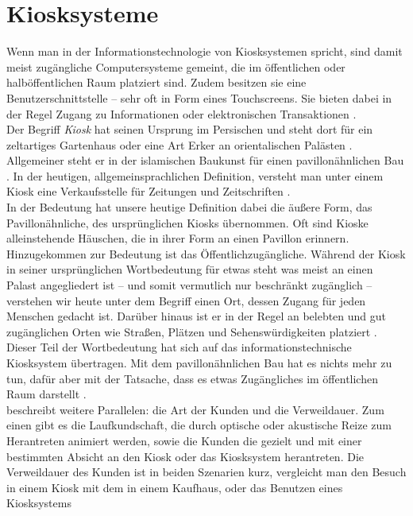 \section{Kiosksysteme}
\label{sec:kiosk}

Wenn man in der Informationstechnologie von Kiosksystemen spricht,
sind damit meist zugängliche Computersysteme gemeint, die im öffentlichen oder halböffentlichen 
Raum platziert sind. Zudem besitzen sie eine Benutzerschnittstelle -- sehr oft in Form
eines Touchscreens. Sie bieten dabei in der Regel Zugang zu Informationen 
oder elektronischen Transaktionen \cite{retailing}.\\

Der Begriff \emph{Kiosk} hat seinen Ursprung im Persischen und steht dort für
ein zeltartiges Gartenhaus oder eine Art Erker an orientalischen Palästen \cite{meyers}.
Allgemeiner steht er in der islamischen Baukunst für einen pavillonähnlichen Bau \cite{taschenlexikon}.
In der heutigen, allgemeinsprachlichen Definition, versteht man unter einem Kiosk eine Verkaufsstelle
für Zeitungen und Zeitschriften \cite{taschenlexikon, meyers}.\\
In der Bedeutung hat unsere heutige Definition dabei die äußere Form, das Pavillonähnliche, 
des ursprünglichen Kiosks übernommen. Oft sind Kioske alleinstehende Häuschen, die in ihrer Form
an einen Pavillon erinnern. Hinzugekommen zur Bedeutung ist das Öffentlichzugängliche. Während der Kiosk 
in seiner ursprünglichen Wortbedeutung für etwas steht was meist an einen Palast angegliedert ist -- und 
somit vermutlich nur beschränkt zugänglich -- verstehen wir heute unter dem Begriff einen Ort, dessen Zugang
für jeden Menschen gedacht ist. Darüber hinaus ist er in der Regel an belebten und gut zugänglichen Orten 
wie Straßen, Plätzen und Sehenswürdigkeiten platziert \cite{multimediale}.\\
Dieser Teil der Wortbedeutung hat sich auf das informationstechnische Kiosksystem übertragen. Mit dem 
pavillonähnlichen Bau hat es nichts mehr zu tun, dafür aber mit der Tatsache, dass es etwas Zugängliches 
im öffentlichen Raum darstellt \cite{multimediale}.\\
 beschreibt weitere Parallelen: die Art der Kunden und 
die Verweildauer. Zum einen gibt es die Laufkundschaft, die durch optische oder akustische Reize
zum Herantreten animiert werden, sowie die Kunden die gezielt und mit einer bestimmten Absicht an den Kiosk
oder das Kiosksystem herantreten. Die Verweildauer des Kunden ist in beiden Szenarien kurz, 
vergleicht man den Besuch in einem Kiosk mit dem in einem Kaufhaus, oder das Benutzen eines Kiosksystems
